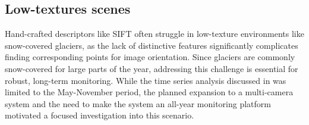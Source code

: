 
\subsection{Low-textures scenes}

Hand-crafted descriptors like SIFT often struggle in low-texture environments like snow-covered glaciers, as the lack of distinctive features significantly complicates finding corresponding points for image orientation. 
Since glaciers are commonly snow-covered for large parts of the year, addressing this challenge is essential for robust, long-term monitoring.
While the time series analysis discussed in  was limited to the May-November period, the planned expansion to a multi-camera system and the need to make the system an all-year monitoring platform motivated a focused investigation into this scenario. 

